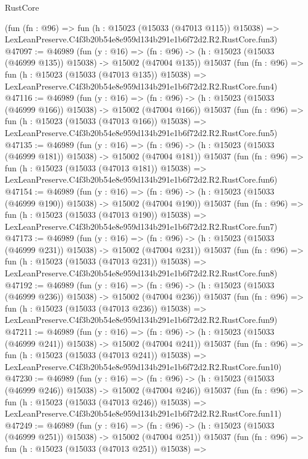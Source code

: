 \begin{lexlean}{RustCore}
\begin{coremodule}
    (fun (fn : @96) =>
    fun (h : @15023 (@15033 (@47013 @115)) @15038) =>
    LexLeanPreserve.C4f3b20b54e8e959d134b291e1b6f72d2.R2.RustCore.fun3)
@47097 := @46989
    (fun (y : @16) =>
    (fn : @96) -> (h : @15023 (@15033 (@46999 @135)) @15038) -> @15002 (@47004 @135))
    @15037
    (fun (fn : @96) =>
    fun (h : @15023 (@15033 (@47013 @135)) @15038) =>
    LexLeanPreserve.C4f3b20b54e8e959d134b291e1b6f72d2.R2.RustCore.fun4)
@47116 := @46989
    (fun (y : @16) =>
    (fn : @96) -> (h : @15023 (@15033 (@46999 @166)) @15038) -> @15002 (@47004 @166))
    @15037
    (fun (fn : @96) =>
    fun (h : @15023 (@15033 (@47013 @166)) @15038) =>
    LexLeanPreserve.C4f3b20b54e8e959d134b291e1b6f72d2.R2.RustCore.fun5)
@47135 := @46989
    (fun (y : @16) =>
    (fn : @96) -> (h : @15023 (@15033 (@46999 @181)) @15038) -> @15002 (@47004 @181))
    @15037
    (fun (fn : @96) =>
    fun (h : @15023 (@15033 (@47013 @181)) @15038) =>
    LexLeanPreserve.C4f3b20b54e8e959d134b291e1b6f72d2.R2.RustCore.fun6)
@47154 := @46989
    (fun (y : @16) =>
    (fn : @96) -> (h : @15023 (@15033 (@46999 @190)) @15038) -> @15002 (@47004 @190))
    @15037
    (fun (fn : @96) =>
    fun (h : @15023 (@15033 (@47013 @190)) @15038) =>
    LexLeanPreserve.C4f3b20b54e8e959d134b291e1b6f72d2.R2.RustCore.fun7)
@47173 := @46989
    (fun (y : @16) =>
    (fn : @96) -> (h : @15023 (@15033 (@46999 @231)) @15038) -> @15002 (@47004 @231))
    @15037
    (fun (fn : @96) =>
    fun (h : @15023 (@15033 (@47013 @231)) @15038) =>
    LexLeanPreserve.C4f3b20b54e8e959d134b291e1b6f72d2.R2.RustCore.fun8)
@47192 := @46989
    (fun (y : @16) =>
    (fn : @96) -> (h : @15023 (@15033 (@46999 @236)) @15038) -> @15002 (@47004 @236))
    @15037
    (fun (fn : @96) =>
    fun (h : @15023 (@15033 (@47013 @236)) @15038) =>
    LexLeanPreserve.C4f3b20b54e8e959d134b291e1b6f72d2.R2.RustCore.fun9)
@47211 := @46989
    (fun (y : @16) =>
    (fn : @96) -> (h : @15023 (@15033 (@46999 @241)) @15038) -> @15002 (@47004 @241))
    @15037
    (fun (fn : @96) =>
    fun (h : @15023 (@15033 (@47013 @241)) @15038) =>
    LexLeanPreserve.C4f3b20b54e8e959d134b291e1b6f72d2.R2.RustCore.fun10)
@47230 := @46989
    (fun (y : @16) =>
    (fn : @96) -> (h : @15023 (@15033 (@46999 @246)) @15038) -> @15002 (@47004 @246))
    @15037
    (fun (fn : @96) =>
    fun (h : @15023 (@15033 (@47013 @246)) @15038) =>
    LexLeanPreserve.C4f3b20b54e8e959d134b291e1b6f72d2.R2.RustCore.fun11)
@47249 := @46989
    (fun (y : @16) =>
    (fn : @96) -> (h : @15023 (@15033 (@46999 @251)) @15038) -> @15002 (@47004 @251))
    @15037
    (fun (fn : @96) =>
    fun (h : @15023 (@15033 (@47013 @251)) @15038) =>

\end{coremodule}
\end{lexlean}
